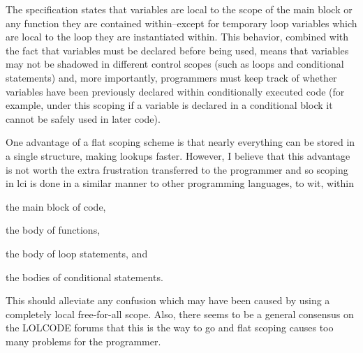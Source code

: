 The specification states that variables are local to the scope of the main block or any function they are contained within--except for temporary loop variables which are local to the loop they are instantiated within. This behavior, combined with the fact that variables must be declared before being used, means that variables may not be shadowed in different control scopes (such as loops and conditional statements) and, more importantly, programmers must keep track of whether variables have been previously declared within conditionally executed code (for example, under this scoping if a variable is declared in a conditional block it cannot be safely used in later code).

One advantage of a flat scoping scheme is that nearly everything can be stored in a single structure, making lookups faster. However, I believe that this advantage is not worth the extra frustration transferred to the programmer and so scoping in lci is done in a similar manner to other programming languages, to wit, within


\begin{DoxyItemize}
\item the main block of code,
\item the body of functions,
\item the body of loop statements, and
\item the bodies of conditional statements.
\end{DoxyItemize}

This should alleviate any confusion which may have been caused by using a completely local free-\/for-\/all scope. Also, there seems to be a general consensus on the L\+O\+L\+C\+O\+DE forums that this is the way to go and flat scoping causes too many problems for the programmer. 